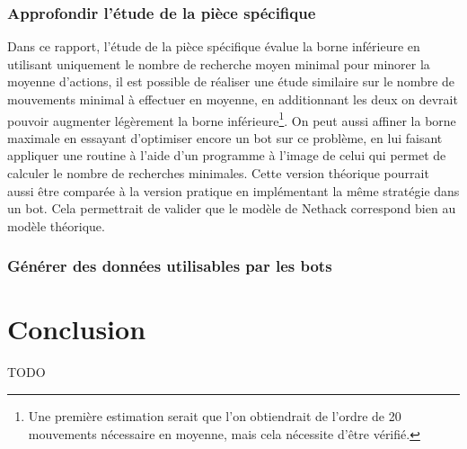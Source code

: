 \documentclass[a4paper,12pt]{article}
\begin{document}
\subsubsection{Approfondir l'étude de la pièce spécifique}
Dans ce rapport, l'étude de la pièce spécifique évalue la borne inférieure en
utilisant uniquement le nombre de recherche moyen minimal pour minorer la
moyenne d'actions, il est possible de réaliser une étude similaire sur le nombre
de mouvements minimal à effectuer en moyenne, en additionnant les deux on
devrait pouvoir augmenter légèrement la borne inférieure\footnote{Une première
estimation serait que l'on obtiendrait de l'ordre de 20 mouvements nécessaire en
moyenne, mais cela nécessite d'être vérifié.}. On peut aussi affiner la borne
maximale en essayant d'optimiser encore un bot sur ce problème, en lui faisant
appliquer une routine à l'aide d'un programme à l'image de celui qui permet de
calculer le nombre de recherches minimales. Cette version théorique pourrait
aussi être comparée à la version pratique en implémentant la même stratégie dans
un bot. Cela permettrait de valider que le modèle de Nethack correspond bien au
modèle théorique.

\subsubsection{Générer des données utilisables par les bots}


\section{Conclusion}
TODO
\end{document}
